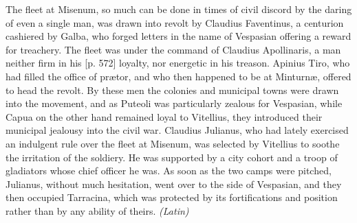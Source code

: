 
The fleet at Misenum, so much can be done in times of civil discord by the daring of even a single man, was drawn into revolt by Claudius Faventinus, a centurion cashiered by Galba, who forged letters in the name of Vespasian offering a reward for treachery. The fleet was under the command of Claudius Apollinaris, a man neither firm in his [p. 572] loyalty, nor energetic in his treason. Apinius Tiro, who had filled the office of prætor, and who then happened to be at Minturnæ, offered to head the revolt. By these men the colonies and municipal towns were drawn into the movement, and as Puteoli was particularly zealous for Vespasian, while Capua on the other hand remained loyal to Vitellius, they introduced their municipal jealousy into the civil war. Claudius Julianus, who had lately exercised an indulgent rule over the fleet at Misenum, was selected by Vitellius to soothe the irritation of the soldiery. He was supported by a city cohort and a troop of gladiators whose chief officer he was. As soon as the two camps were pitched, Julianus, without much hesitation, went over to the side of Vespasian, and they then occupied Tarracina, which was protected by its fortifications and position rather than by any ability of theirs. \emph{(Latin)}


